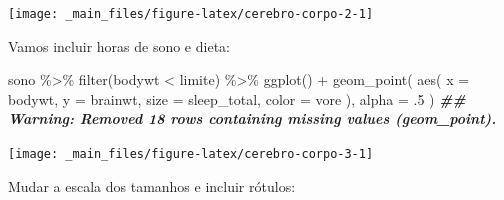 \documentclass[
  12pt]{report}
\newenvironment{Shaded}{\begin{snugshade}}{\end{snugshade}}
\newcommand{\AttributeTok}[1]{\textcolor[rgb]{0.77,0.63,0.00}{#1}}
\newcommand{\DecValTok}[1]{\textcolor[rgb]{0.00,0.00,0.81}{#1}}
\newcommand{\DocumentationTok}[1]{\textcolor[rgb]{0.56,0.35,0.01}{\textbf{\textit{#1}}}}
\newcommand{\FunctionTok}[1]{\textcolor[rgb]{0.00,0.00,0.00}{#1}}
\newcommand{\NormalTok}[1]{#1}
\newcommand{\SpecialCharTok}[1]{\textcolor[rgb]{0.00,0.00,0.00}{#1}}
\begin{document}
\begin{center}\texttt{[image: \_main\_files/figure-latex/cerebro-corpo-2-1]} \end{center}

Vamos incluir horas de sono e dieta:

\begin{Shaded}
\begin{Highlighting}[]
\NormalTok{sono }\SpecialCharTok{\%\textgreater{}\%} 
  \FunctionTok{filter}\NormalTok{(bodywt }\SpecialCharTok{\textless{}}\NormalTok{ limite) }\SpecialCharTok{\%\textgreater{}\%} 
  \FunctionTok{ggplot}\NormalTok{() }\SpecialCharTok{+}
    \FunctionTok{geom\_point}\NormalTok{(}
      \FunctionTok{aes}\NormalTok{(}
        \AttributeTok{x =}\NormalTok{ bodywt, }
        \AttributeTok{y =}\NormalTok{ brainwt,}
        \AttributeTok{size =}\NormalTok{ sleep\_total,}
        \AttributeTok{color =}\NormalTok{ vore}
\NormalTok{      ), }
      \AttributeTok{alpha =}\NormalTok{ .}\DecValTok{5}
\NormalTok{    )}
\DocumentationTok{\#\# Warning: Removed 18 rows containing missing values (geom\_point).}
\end{Highlighting}
\end{Shaded}

\begin{center}\texttt{[image: \_main\_files/figure-latex/cerebro-corpo-3-1]} \end{center}

Mudar a escala dos tamanhos e incluir rótulos:
\end{document}
